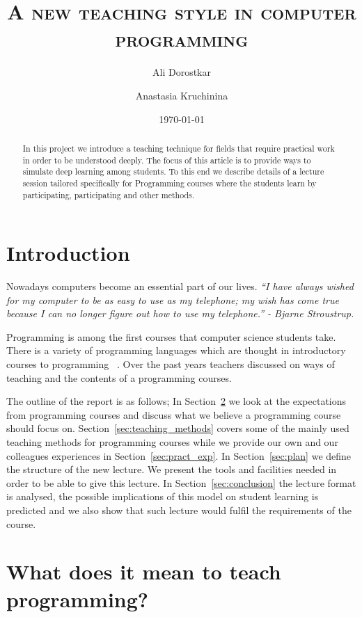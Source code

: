 \documentclass{article}
\author{Ali Dorostkar \and Anastasia Kruchinina}
\title{\textsc{A new teaching style in computer programming}}
\date{\today}
\begin{document}
\maketitle
\begin{abstract}
In this project we introduce a teaching technique for fields that require
practical work in order to be understood deeply. The focus of this article is
to provide ways to simulate deep learning among students. To this end we describe
details of a lecture session tailored specifically for Programming courses
where the students learn by participating, participating and other methods.
\end{abstract}

\section{Introduction} %
\label{sec:introduction}

Nowadays computers become an essential part of our lives.  \emph{``I have always wished
for my computer to be as easy to use as my telephone; my wish has come true
because I can no longer figure out how to use my telephone.'' - Bjarne
Stroustrup.}

Programming is among the first courses that computer science students take.
There is a variety of programming languages which are thought in introductory
courses to programming ~\cite{de2002language}. Over the past years teachers
discussed on ways of teaching and the contents of a programming courses.

The outline of the report is as follows; In
Section~\ref{sec:meaning_of_programming} we look at the expectations
from programming courses and discuss what we believe a programming
course should focus on. Section~\ref{sec:teaching_methods} covers
some of the mainly used teaching methods for programming courses while we provide
our own and our colleagues experiences in Section~\ref{sec:pract_exp}.
In Section~\ref{sec:plan} we define the structure of the new lecture. We present the tools and facilities needed in order to be able to give this lecture. In
Section~\ref{sec:conclusion} the lecture format is analysed, the possible
implications of this model on student learning is predicted and we
also show that such lecture would fulfil the requirements of the
course.

\section{What does it mean to teach programming?}
\label{sec:meaning_of_programming}
\end{document}
